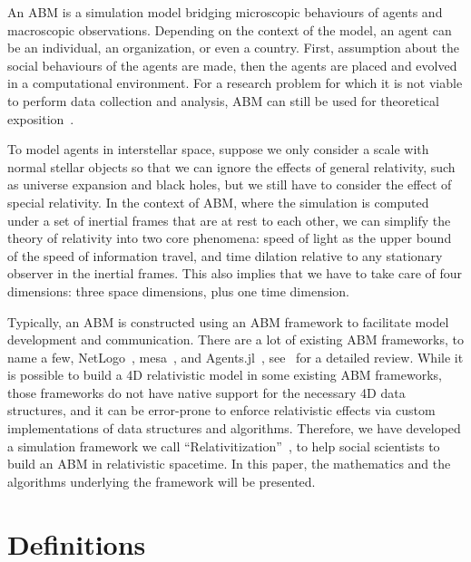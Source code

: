 \documentclass{svproc}
\begin{document}
An ABM is a simulation model bridging microscopic behaviours of agents and macroscopic observations.
Depending on the context of the model, an agent can be an individual, an organization, or even a country.
First, assumption about the social behaviours of the agents are made, then the agents are placed and evolved
in a computational environment.
For a research problem for which it is not viable to perform data collection and analysis,
ABM can still be used for theoretical exposition~\cite{edmonds2015simulating}.

To model agents in interstellar space, suppose we only consider a scale with normal stellar objects
so that we can ignore the effects of general relativity, such as universe expansion and black holes,
but we still have to consider the effect of special relativity.
In the context of ABM, where the simulation is computed under a set of inertial frames that are at rest to each other,
we can simplify the theory of relativity into two core
phenomena: speed of light as the upper bound of the speed of information travel, and
time dilation relative to any stationary observer in the inertial frames.
This also implies that we have to take care of four dimensions: three space dimensions, plus one time dimension.

Typically, an ABM is constructed using an ABM framework to facilitate model development and communication.
There are a lot of existing ABM frameworks, to name a few, NetLogo~\cite{netlogo}, mesa~\cite{python-mesa-2020},
and Agents.jl~\cite{Agents2021}, see~\cite{pal2020review} for a detailed review.
While it is possible to build a 4D relativistic model in some existing ABM frameworks, 
those frameworks do not have native support for the necessary 4D data structures,
and it can be error-prone to enforce relativistic effects via custom implementations of data structures and algorithms.
Therefore, we have developed a simulation framework we call ``Relativitization''~\cite{relativitization},
to help social scientists to build an ABM in relativistic spacetime.
In this paper, the mathematics and the algorithms underlying the framework will be presented.

\section{Definitions}
\end{document}
